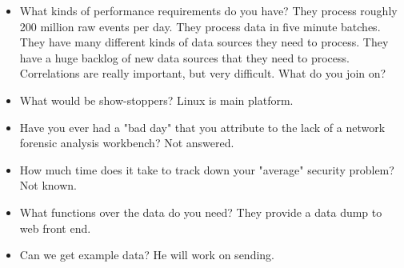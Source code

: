 \documentclass{article}
\begin{document}
\begin{itemize}
\item What kinds of performance requirements do you have?  
They process roughly 200 million raw events per day.  They process
data in five minute batches.  They have many different kinds of data
sources they need to process.  They have a huge backlog of new data
sources that they need to process.  Correlations are really important,
but very difficult.  What do you join on?

\item What would be show-stoppers?  
Linux is main platform.

\item Have you ever had a "bad day" that you attribute to the lack of a network forensic analysis workbench?
Not answered.

\item How much time does it take to track down your "average" security
  problem?
Not known.

\item What functions over the data do you need?
They provide a data dump to web front end.

\item Can we get example data?
He will work on sending.

\end{itemize}
\end{document}
